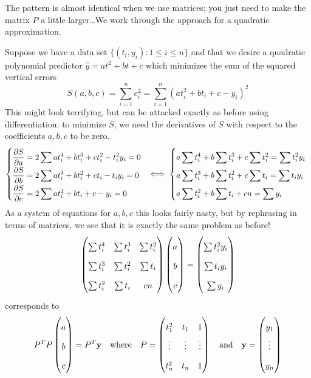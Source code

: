 \goodbreak



The pattern is almost identical when we use matrices; you just need to make the matrix $P$ a little larger\ldots We work through the approach for a quadratic approximation.\smallbreak

Suppose we have a data set $\{(t_i,y_i):1\le i\le n\}$ and that we desire a quadratic polynomial predictor $\hat y=at^2+bt+c$ which minimizes the sum of the squared vertical errors
\[
	S(a,b,c)=\sum_{i=1}^n e_i^2=\sum_{i=1}^n(at_i^2+bt_i+c-y_i)^2
\]
This might look terrifying, but can be attacked exactly as before using differentiation: to minimize $S$, we need the derivatives of $S$ with respect to the coefficients $a,b,c$ to be zero.
\begin{gather*}
	\def\arraystretch{1.9}
	\left\{
	\begin{array}{@{}lll}
		\displaystyle\partials[S]{a}=2\sum at_i^4+bt_i^3+ct_i^2-t_i^2y_i=0\\
		\displaystyle\partials[S]{b}=2\sum at_i^3+bt_i^2+ct_i-t_iy_i=0\\
		\displaystyle\partials[S]{c}=2\sum at_i^2+bt_i+c-y_i=0
	\end{array}
	\right.
	\iff
	\left\{
	\begin{array}{@{}lll}
		\displaystyle a\sum t_i^4+b\sum t_i^3+c\sum t_i^2=\sum t_i^2y_i\\
		\displaystyle a\sum t_i^3+b\sum t_i^2+c\sum t_i=\sum t_iy_i\\
		\displaystyle a\sum t_i^2+b\sum t_i+cn=\sum y_i
	\end{array}
	\right.
\end{gather*}
As a system of equations for $a,b,c$ this looks fairly nasty, but by rephrasing in terms of matrices, we see that it is exactly the same problem as before!
\[
	\begin{pmatrix}
		\sum t_i^4 & \sum t_i^3 & \sum t_i^2\\
		\sum t_i^3 & \sum t_i^2 & \sum t_i\\
		\sum t_i^2 & \sum t_i & cn
	\end{pmatrix}
	\threevec abc=\threevec{\sum t_i^2y_i}{\sum t_iy_i}{\sum y_i}
\]
corresponds to
\[
	P^TP\threevec abc=P^T\vy
	\quad\text{where}\quad
	P=
	\begin{pmatrix}
		t_1^2&t_1&1\\
		\vdots&\vdots&\vdots\\
		t_n^2&t_n&1
	\end{pmatrix}
	\quad \text{and}
	\quad\vy=\threevec{y_1}{\vdots}{y_n}
\]
